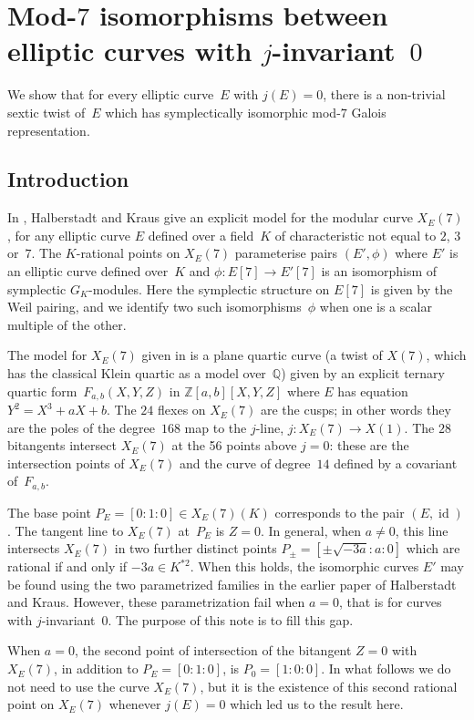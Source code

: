 \documentclass[12pt]{amsart}
\newcommand{\Q}{\mathbb{Q}}
\newcommand{\Z}{\mathbb{Z}}
\DeclareMathOperator{\id}{id}
\numberwithin{equation}{section}
\theoremstyle{definition}
\theoremstyle{remark}
\begin{document}
\section{Mod-$7$ isomorphisms between elliptic curves with
  $j$-invariant~$0$}
We show that for every elliptic curve~$E$ with $j(E)=0$, there is a
non-trivial sextic twist of~$E$ which has symplectically isomorphic
mod-$7$ Galois representation.

\subsection{Introduction}
In \cite{Halberstadt-Kraus-XE7}, Halberstadt and Kraus give an
explicit model for the modular curve $X_E(7)$, for any elliptic curve
$E$ defined over a field~$K$ of characteristic not equal to $2$, $3$
or~$7$. The $K$-rational points on $X_E(7)$ parameterise pairs
$(E',\phi)$ where $E'$ is an elliptic curve defined over~$K$ and
$\phi:E[7]\to E'[7]$ is an isomorphism of symplectic $G_K$-modules.
Here the symplectic structure on $E[7]$ is given by the Weil pairing,
and we identify two such isomorphisms~$\phi$ when one is a scalar
multiple of the other.

The model for $X_E(7)$ given in \cite{Halberstadt-Kraus-XE7} is a
plane quartic curve (a twist of $X(7)$, which has the classical Klein
quartic as a model over~$\Q$) given by an explicit ternary quartic
form~$F_{a,b}(X,Y,Z)$ in $\Z[a,b][X,Y,Z]$ where $E$ has equation
$Y^2=X^3+aX+b$.  The $24$ flexes on $X_E(7)$ are the cusps; in other
words they are the poles of the degree~$168$ map to the $j$-line, $j:
X_E(7)\to X(1)$.  The $28$ bitangents intersect $X_E(7)$ at the 56
points above $j=0$: these are the intersection points of $X_E(7)$ and
the curve of degree~$14$ defined by a covariant of~$F_{a,b}$.

The base point $P_E=[0:1:0]\in X_E(7)(K)$ corresponds to the pair
$(E,\id)$.  The tangent line to $X_E(7)$ at~$P_E$ is $Z=0$.  In
general, when $a\not=0$, this line intersects $X_E(7)$ in two further
distinct points $P_{\pm}=[\pm\sqrt{-3a}:a:0]$ which are rational if
and only if $-3a\in K^{*2}$.  When this holds, the isomorphic curves
$E'$ may be found using the two parametrized families in the earlier
paper \cite{Halberstadt-Kraus-YE7} of Halberstadt and Kraus.  However,
these parametrization fail when $a=0$, that is for curves with
$j$-invariant~$0$.  The purpose of this note is to fill this gap.

When $a=0$, the second point of intersection of the bitangent $Z=0$
with $X_E(7)$, in addition to $P_E=[0:1:0]$, is $P_0=[1:0:0]$.  In
what follows we do not need to use the curve $X_E(7)$, but it is the
existence of this second rational point on $X_E(7)$ whenever $j(E)=0$
which led us to the result here.
\end{document}
